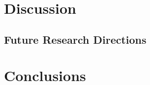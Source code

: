\documentclass{egpubl}
\begin{document}
\section{Discussion}

\subsection{Future Research Directions}

\section{Conclusions}




%



\end{document}
